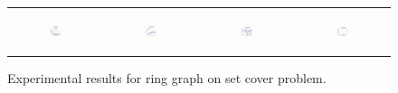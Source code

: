 \begin{figure}[ht]
\begin{tabular}{cccc}
	  \begin{subfigure}[h]{0.22\textwidth}
	  	\includegraphics[width=110pt]{images/runtime_ring_maxgraphcut.pdf}
			\caption{}
			\label{appfig:runtime_ring_maxgraphcut}
	  \end{subfigure} &
	  \begin{subfigure}[h]{0.22\textwidth}
	  	\includegraphics[width=110pt]{images/speedup_ring_maxgraphcut.pdf}
			\caption{}
			\label{appfig:speedup_ring_maxgraphcut}
	  \end{subfigure} &
	  \begin{subfigure}[h]{0.22\textwidth}
	  	\includegraphics[width=110pt]{images/diffFA_CF2G_ring_maxgraphcut.pdf}
			\caption{}
			\label{appfig:diffFA_CF2G_ring_maxgraphcut}
	  \end{subfigure} &
	  \begin{subfigure}[h]{0.22\textwidth}
	  	\includegraphics[width=110pt]{images/validated_CC2G_ring_maxgraphcut.pdf}
			\caption{}
			\label{appfig:validated_CC2G_ring_maxgraphcut.pdf}
	  \end{subfigure} \\
  \end{tabular}
  \caption{\footnotesize Experimental results for ring graph on set cover problem.}
\label{appfig:results_adversarial}
\end{figure}











